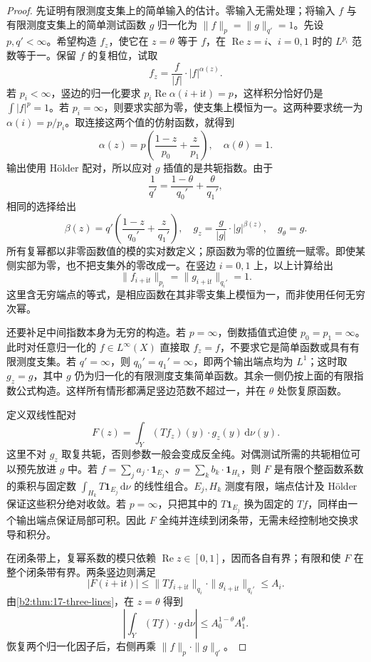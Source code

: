\begin{proof}
先证明有限测度支集上的简单输入的估计。零输入无需处理；将输入 \(f\) 与有限测度支集上的简单测试函数 \(g\) 归一化为
\(\|f\|_p=\|g\|_{q'}=1\)。先设 \(p,q'<\infty\)。希望构造 \(f_z\)，使它在 \(z=\theta\) 等于 \(f\)，在 \(\operatorname{Re}z=i\)、\(i=0,1\) 时的 \(L^{p_i}\) 范数等于一。保留 \(f\) 的复相位，试取
\[
 f_z=\frac f{|f|}\cdot|f|^{\alpha(z)}.
\]
若 \(p_i<\infty\)，竖边的归一化要求
\(p_i\operatorname{Re}\alpha(i+\mathrm it)=p\)，这样积分恰好仍是 \(\int|f|^p=1\)。若 \(p_i=\infty\)，则要求实部为零，使支集上模恒为一。这两种要求统一为 \(\alpha(i)=p/p_i\)。取连接这两个值的仿射函数，就得到
\[
 \alpha(z)=p\left(\frac{1-z}{p_0}+\frac z{p_1}\right),
 \quad \alpha(\theta)=1.
\]
输出使用 Hölder 配对，所以应对 \(g\) 插值的是共轭指数。由于
\[
 \frac1{q'}=\frac{1-\theta}{q_0'}+\frac\theta{q_1'},
\]
相同的选择给出
\[
 \beta(z)=q'\left(\frac{1-z}{q_0'}+\frac z{q_1'}\right),
 \quad
 g_z=\frac g{|g|}\cdot|g|^{\beta(z)},
 \quad g_\theta=g.
\]
所有复幂都以非零函数值的模的实对数定义；原函数为零的位置统一赋零。即使某侧实部为零，也不把支集外的零改成一。在竖边 \(i=0,1\) 上，以上计算给出
\[
 \|f_{i+\mathrm it}\|_{p_i}
 =\|g_{i+\mathrm it}\|_{q_i'}=1.
\]
这里含无穷端点的等式，是相应函数在其非零支集上模恒为一，而非使用任何无穷次幂。

还要补足中间指数本身为无穷的构造。若 \(p=\infty\)，倒数插值式迫使 \(p_0=p_1=\infty\)。此时对任意归一化的 \(f\in L^\infty(X)\) 直接取 \(f_z=f\)，不要求它是简单函数或具有有限测度支集。若 \(q'=\infty\)，则 \(q_0'=q_1'=\infty\)，即两个输出端点均为 \(L^1\)；这时取 \(g_z=g\)，其中 \(g\) 仍为归一化的有限测度支集简单函数。其余一侧仍按上面的有限指数公式构造。这样所有情形都满足竖边范数不超过一，并在 \(\theta\) 处恢复原函数。

定义双线性配对
\[
 F(z)=\int_Y (Tf_z)(y)\cdot g_z(y)\,\mathrm d\nu(y).
\]
这里不对 \(g_z\) 取复共轭，否则参数一般会变成反全纯。对偶测试所需的共轭相位可以预先放进 \(g\) 中。若 \(f=\sum_j a_j\cdot\mathbf1_{E_j}\)、\(g=\sum_k b_k\cdot\mathbf1_{H_k}\)，则 \(F\) 是有限个整函数系数的乘积与固定数
\(\int_{H_k}T\mathbf1_{E_j}\,\mathrm d\nu\) 的线性组合。\(E_j,H_k\) 测度有限，端点估计及 Hölder 保证这些积分绝对收敛。若 \(p=\infty\)，只把其中的 \(T\mathbf1_{E_j}\) 换为固定的 \(Tf\)，同样由一个输出端点保证局部可积。因此 \(F\) 全纯并连续到闭条带，无需未经控制地交换求导和积分。

在闭条带上，复幂系数的模只依赖 \(\operatorname{Re}z\in[0,1]\)，因而各自有界；有限和使 \(F\) 在整个闭条带有界。两条竖边则满足
\[
 |F(i+\mathrm it)|
 \leq\|Tf_{i+\mathrm it}\|_{q_i}
 \cdot\|g_{i+\mathrm it}\|_{q_i'}
 \leq A_i.
\]
由\cref{b2:thm:17-three-lines}，在 \(z=\theta\) 得到
\[
 \left|\int_Y (Tf)\cdot g\,\mathrm d\nu\right|
 \leq A_0^{1-\theta}A_1^\theta.
\]
恢复两个归一化因子后，右侧再乘 \(\|f\|_p\cdot\|g\|_{q'}\)。


\end{proof}
